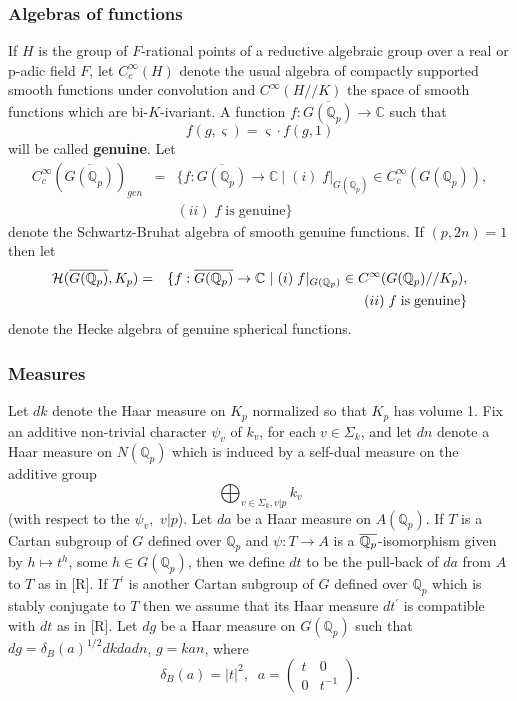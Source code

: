 \documentclass[amsfonts,12pt]{article}
\def\qqq{\mathbb{Q}}
\def\ccc{\mathbb{C}}
\begin{document}
\subsubsection{Algebras of functions}

If $H$ is the group of $F$-rational points of a reductive algebraic group
over a real or p-adic field $F$, let $C_c^\infty (H)$ denote the usual
algebra of compactly supported smooth functions under convolution and $%
C^\infty (H//K)$ the space of smooth functions which are bi-$K$-ivariant. A
function $f:\overline{G(\qqq_p)}\rightarrow \ccc $ such that 
\begin{equation}
f(g,\varsigma )=\varsigma \cdot f(g,1)
\end{equation}
will be called {\bf genuine}. Let 
\begin{eqnarray*}
C_c^\infty (\overline{G(\qqq_p)})_{gen}
&=&\{f:\overline{G(\qqq_p)}%
\rightarrow \ccc \
|\;(i)\;f|_{G(\qqq_p)}\in C_c^\infty (G(\qqq_p)),
\\
&&(ii)\;f\;\mathrm{is\;genuine}\}
\end{eqnarray*}
denote the Schwartz-Bruhat algebra of smooth genuine functions.
If $(p,2n)=1$ then let 
\begin{eqnarray*}
{\cal{H}}(\overline{G(\qqq_p)},K_p)
&=&\{f:\overline{G(\qqq_p)}\rightarrow \ccc 
\ |\;(i)\;f|_{G(\qqq_p)}\in
C^\infty (G(\qqq_p)//K_p), \\
&&\ (ii)\;f\;\mathrm{is\;genuine}\}
\end{eqnarray*}
denote the Hecke algebra of genuine spherical functions.

\subsubsection{Measures}

Let $dk$ denote the Haar measure on $K_p$ normalized so that $K_p$ has
volume 1. Fix an additive non-trivial character $\psi _v$ of $k_v$, for each$%
\;v\in \Sigma _k$, and let $dn$ denote a Haar measure on $N(\qqq_p)$
which is induced by a self-dual measure on the additive group 
\[
\bigoplus_{v\in \Sigma _k, v|p}k_v
\]
(with respect to the $\psi _v,$ $v|p$).
Let $da$ be a Haar measure on $A(\qqq_p)$. If $T$ is a Cartan subgroup of 
$G$ defined over $\qqq_p$ and $\psi :T\rightarrow A$ is a $\overline{\Bbb{%
Q}_p}$-isomorphism given by $h\longmapsto t^h$, some $h\in G(\qqq_p)$,
then we define $dt$ to be the pull-back of $da$ from $A$ to $T$ as in [R].
If $T^{\prime }$ is another Cartan subgroup of $G$ defined over $\qqq_p$
which is stably conjugate to $T$ then we assume that its Haar measure
$dt^{\prime }$ is compatible with $dt$ as in [R]. Let $dg$ be a Haar measure
on $G(\qqq_p)$ such that $dg=\delta _B(a)^{1/2}dkdadn$, $g=kan$, where 
\begin{equation}
\delta _B(a)=|t|^2,\;\;a=\left( 
\begin{array}{cc}
t & 0 \\ 
0 & t^{-1}
\end{array}
\right) .
\end{equation}
\end{document}
